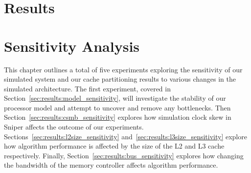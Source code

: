 \chapter{Results}
\label{cpt:results}




\chapter{Sensitivity Analysis}
\label{cpt:sresults}
This chapter outlines a total of five experiments exploring the sensitivity of our simulated system and our cache partitioning results to various changes in the simulated architecture.
The first experiment, covered in Section~\ref{sec:results:model_sensitivity}, will investigate the stability of our processor model and attempt to uncover and remove any bottlenecks.
Then Section~\ref{sec:results:csmb_sensitivity} explores how simulation clock skew in Sniper affects the outcome of our experiments.
Sections~\ref{sec:results:l2size_sensitivity} and~\ref{sec:results:l3size_sensitivity} explore how algorithm performance is affected by the size of the L2 and L3 cache respectively.
Finally, Section~\ref{sec:results:bus_sensitivity} explores how changing the bandwidth of the memory controller affects algorithm performance.










